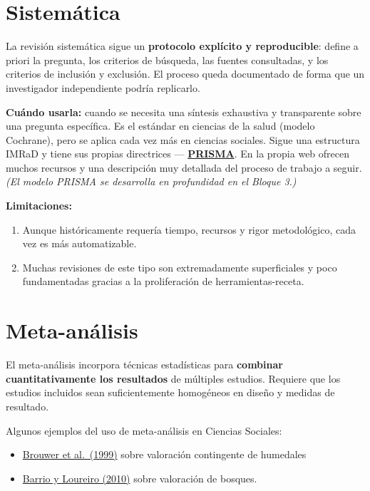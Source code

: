 \documentclass[
]{book}
\providecommand{\tightlist}{%
  \setlength{\itemsep}{0pt}\setlength{\parskip}{0pt}}
\begin{document}
\section{Sistemática}\label{sistemuxe1tica}

La revisión sistemática sigue un \textbf{protocolo explícito y reproducible}: define a priori la pregunta, los criterios de búsqueda, las fuentes consultadas, y los criterios de inclusión y exclusión. El proceso queda documentado de forma que un investigador independiente podría replicarlo.

\textbf{Cuándo usarla:} cuando se necesita una síntesis exhaustiva y transparente sobre una pregunta específica. Es el estándar en ciencias de la salud (modelo Cochrane), pero se aplica cada vez más en ciencias sociales. Sigue una estructura IMRaD y tiene sus propias directrices --- \href{https://www.prisma-statement.org/}{\textbf{PRISMA}}. En la propia web ofrecen muchos recursos y una descripción muy detallada del proceso de trabajo a seguir. \emph{(El modelo PRISMA se desarrolla en profundidad en el Bloque 3.)}

\textbf{Limitaciones:}

\begin{enumerate}
\def\labelenumi{\arabic{enumi}.}
\tightlist
\item
  Aunque históricamente requería tiempo, recursos y rigor metodológico, cada vez es más automatizable.
\item
  Muchas revisiones de este tipo son extremadamente superficiales y poco fundamentadas gracias a la proliferación de herramientas-receta.
\end{enumerate}

\section{Meta-análisis}\label{meta-anuxe1lisis}

El meta-análisis incorpora técnicas estadísticas para \textbf{combinar cuantitativamente los resultados} de múltiples estudios. Requiere que los estudios incluidos sean suficientemente homogéneos en diseño y medidas de resultado.

Algunos ejemplos del uso de meta-análisis en Ciencias Sociales:

\begin{itemize}
\item
  \href{https://doi.org/10.1007/s101130050007}{Brouwer et al.~(1999)} sobre valoración contingente de humedales
\item
  \href{https://www.sciencedirect.com/science/article/abs/pii/S0921800909004650}{Barrio y Loureiro (2010)} sobre valoración de bosques.
\end{itemize}
\end{document}
